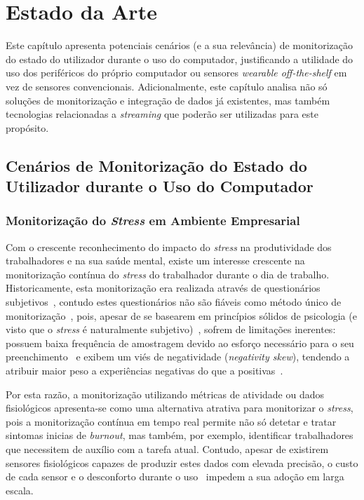 \chapter{Estado da Arte}
\label{chap:estadodaarte}

\begin{introduction}
Este capítulo apresenta potenciais cenários (e a sua relevância) de monitorização do estado do utilizador durante o uso do computador, justificando a utilidade do uso dos periféricos do próprio computador ou sensores \textit{wearable off-the-shelf} em vez de sensores convencionais.
Adicionalmente, este capítulo analisa não só soluções de monitorização e integração de dados já existentes, mas também tecnologias relacionadas a \textit{streaming} que poderão ser utilizadas para este propósito.
\end{introduction}

\section{Cenários de Monitorização do Estado do Utilizador durante o Uso do Computador}

\subsection{Monitorização do \textit{Stress} em Ambiente Empresarial}

Com o crescente reconhecimento do impacto do \textit{stress} na produtividade dos trabalhadores e na sua saúde mental, existe um interesse crescente na monitorização contínua do \textit{stress} do trabalhador durante o dia de trabalho.
Historicamente, esta monitorização era realizada através de questionários subjetivos~\cite{Kafkov2024,Kallio2025}, contudo estes questionários não são fiáveis como método único de monitorização~\cite{Kafkov2024,Kallio2025}, pois, apesar de se basearem em princípios sólidos de psicologia (e visto que o \textit{stress} é naturalmente subjetivo)~\cite{Kafkov2024,Kallio2025}, sofrem de limitações inerentes: possuem baixa frequência de amostragem devido ao esforço necessário para o seu preenchimento~\cite{Kallio2025} e exibem um viés de negatividade (\textit{negativity skew}), tendendo a atribuir maior peso a experiências negativas do que a positivas~\cite{Kallio2025}.

Por esta razão, a monitorização utilizando métricas de atividade ou dados fisiológicos apresenta-se como uma alternativa atrativa para monitorizar o \textit{stress}, pois a monitorização contínua em tempo real permite não só detetar e tratar sintomas inicias de \textit{burnout}, mas também, por exemplo, identificar trabalhadores que necessitem de auxílio com a tarefa atual.
Contudo, apesar de existirem sensores fisiológicos capazes de produzir estes dados com elevada precisão, o custo de cada sensor e o desconforto durante o uso~\cite{Kallio2025} impedem a sua adoção em larga escala.

